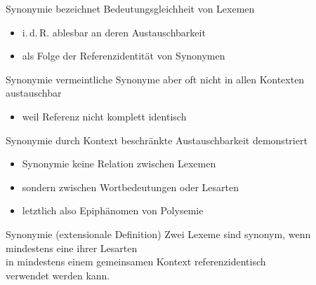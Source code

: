 \begin{frame}{Synonymie}
\onslide<+->
bezeichnet Bedeutungsgleichheit von Lexemen
\Halbzeile
\begin{itemize}[<+->]
	\item		i.\,d.\,R. ablesbar an deren Austauschbarkeit
	\item		als Folge der Referenzidentität von Synonymen
\end{itemize}
\onslide<+->
\Zeile
\begin{exe}
	 \onslide<+->
	 \onslide<+->
\end{exe}
\end{frame}

\begin{frame}{Synonymie}
\onslide<+->
vermeintliche Synonyme aber oft nicht in allen Kontexten austauschbar
\Halbzeile
\begin{itemize}[<+->]
	\item		weil Referenz nicht komplett identisch
\end{itemize}
\onslide<+->
\Zeile
\begin{exe}
	 \onslide<+->
	 \onslide<+->
\end{exe}
\end{frame}

\begin{frame}{Synonymie}
\onslide<+->
durch Kontext beschränkte Austauschbarkeit demonstriert
\Halbzeile
\begin{itemize}[<+->]
	\item		Synonymie keine Relation zwischen Lexemen
	\item		sondern zwischen Wortbedeutungen oder Lesarten
	\item		letztlich also Epiphänomen von Polysemie
\end{itemize}
\onslide<+->
\Zeile
\begin{block}{Synonymie (extensionale Definition)}
Zwei Lexeme sind synonym, wenn mindestens eine ihrer Lesarten\\
in mindestens einem gemeinsamen Kontext referenzidentisch\\
verwendet werden kann. \citep[67 (modifiziert)]{Harm2015}
\end{block}
\end{frame}

